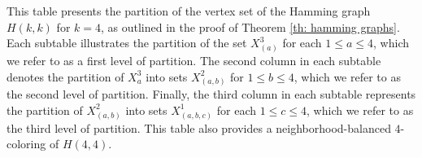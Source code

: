 \documentclass[12pt]{article}
\begin{document}
\begin{table}[p]
    \caption{This table presents the partition of the vertex set of the Hamming graph $H(k,k)$ for $k=4$, as outlined in the proof of Theorem \ref{th: hamming graphs}.
    Each subtable illustrates the partition of the set $X_{(a)}^{3}$ for each $1 \le a \le 4$, which we refer to as a first level of partition. The second column in each subtable denotes the partition of $X_{a}^{3}$ into sets $X_{(a,b)}^{2}$ for $1 \le b \le 4$, which we refer to as the second level of partition.
    Finally, the third column in each subtable represents the partition of $X^{2}_{(a,b)}$ into sets $X^1_{(a,b,c)}$ for each $1 \le c \le 4$, which we refer to as the third level of partition.
    This table also provides a neighborhood-balanced $4$-coloring of $H(4,4)$.}
    \label{tab: partition of vertex set of H(4,4)}
\end{table}
\end{document}
